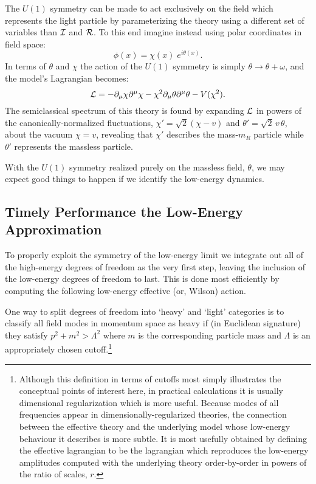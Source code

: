 \documentclass[12pt]{article}
\def\sst{\scriptscriptstyle}
\begin{document}
The $U(1)$ symmetry can be made to act exclusively
on the field which represents the light particle
by parameterizing the theory using a different set of variables
than ${\cal I}$ and ${\cal R}$. 
To this end imagine instead using polar coordinates in field space:
%
\begin{equation}
\label{polcoords}
\phi(x) = \chi(x) \; e^{i \theta(x)} .
\end{equation}
%
In terms of $\theta$ and $\chi$ the action of the 
$U(1)$ symmetry is simply $\theta \to \theta + \omega$, 
and the model's Lagrangian becomes: 
%
\begin{equation}
\label{linpolcoords}
{\cal L} = - \partial_\mu \chi \partial^\mu \chi - \chi^2 \partial_\mu \theta
\partial^\mu \theta - V(\chi^2).
\end{equation}
%
The semiclassical spectrum of this theory is found by expanding
${\cal L}$ in powers of the canonically-normalized
fluctuations, $\chi' = \sqrt2 (\chi - v)$ and $\theta'
= \sqrt2 \, v \, \theta$, about the vacuum $\chi = v$, revealing
that $\chi'$ describes the mass-$m_{\sst R}$ particle while
$\theta'$ represents the massless particle. 

With the $U(1)$ symmetry realized purely on the massless
field, $\theta$, we may expect good things to happen if we
identify the low-energy dynamics. 

\subsection{Timely Performance the Low-Energy Approximation}

To properly exploit the symmetry of the low-energy limit we
integrate out all of the high-energy degrees of freedom as the
very first step, leaving the inclusion of the low-energy degrees
of freedom to last. This is done most efficiently by computing
the following low-energy effective (or, Wilson) action. 

One way to split degrees of freedom into `heavy' and `light'
categories is to classify all field modes in momentum
space as heavy if (in Euclidean signature) 
they satisfy $p^2 + m^2 > \Lambda^2$ where $m$ is the
corresponding particle mass and $\Lambda$ is an 
appropriately chosen cutoff.\footnote{Although this
definition in terms of cutoffs most simply illustrates
the conceptual points of interest here, in practical calculations
it is usually dimensional regularization which is more
useful. Because modes of all frequencies appear in
dimensionally-regularized theories, the connection between
the effective theory and the underlying model whose low-energy
behaviour it describes is more subtle. It is most usefully
obtained by defining the effective lagrangian to be the
lagrangian which reproduces the low-energy 
amplitudes computed with the underlying theory order-by-order
in powers of the ratio of scales, 
$r$.\cite{Burgess95,ETbooks,ETreviews}} 
\end{document}
